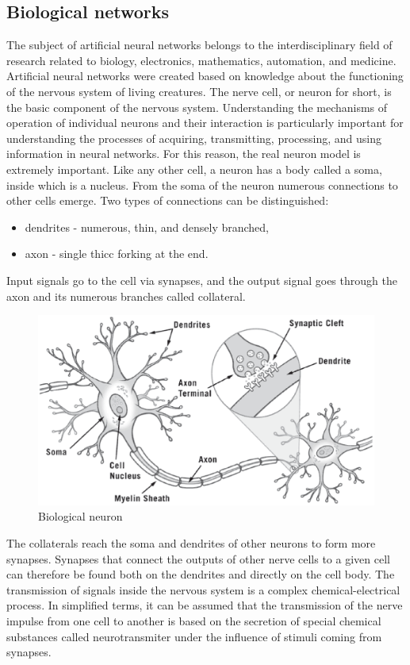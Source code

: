 \subsection{Biological networks}
The subject of artificial neural networks belongs to the interdisciplinary field of research 
related to biology, electronics, mathematics, automation, and medicine.
Artificial neural networks were created based on knowledge about the functioning of the nervous
system of living creatures. 
The nerve cell, or neuron for short, is the basic component of the nervous system.
Understanding the mechanisms of operation of individual neurons and their interaction is 
particularly important for understanding the processes of acquiring, transmitting, processing,
and using information in neural networks.
For this reason, the real neuron model is extremely important. Like any other cell, a neuron has
a body called a soma, inside which is a nucleus.
From the soma of the neuron numerous connections to other cells emerge.
Two types of connections can be distinguished:
\begin{itemize}
	\item dendrites - numerous, thin, and densely branched, 
	\item axon -  single thicc forking at the end.
\end{itemize}
Input signals go to the cell via synapses, and the output signal goes through the axon
and its numerous branches called collateral.
\begin{figure}[htb] 
	\label{fig:neuron}
	\centering
	\includegraphics[width=\textwidth]{figures/neural_cell}
	\caption{Biological neuron}
\end{figure}
The collaterals reach the soma and dendrites of other neurons to form more synapses. 
Synapses that connect the outputs of other nerve cells to a given cell can therefore be found
both on the dendrites and directly on the cell body.
The transmission of signals inside the nervous system is a complex chemical-electrical process. 
In simplified terms, it can be assumed that the transmission of the nerve impulse from one cell to
another is based on the secretion of special chemical substances called neurotransmiter 
under the influence of stimuli coming from synapses.

